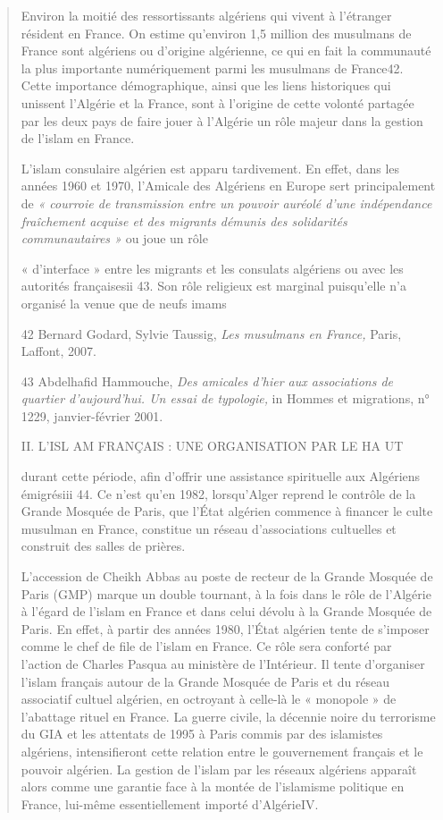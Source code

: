 \begin{quote}
Environ la moitié des ressortissants algériens qui vivent à l'étranger
résident en France. On estime qu'environ 1,5 million des musulmans de
France sont algériens ou d'origine algérienne, ce qui en fait la
communauté la plus importante numériquement parmi les musulmans de
France42. Cette importance démographique, ainsi que les liens
historiques qui unissent l'Algérie et la France, sont à l'origine de
cette volonté partagée par les deux pays de faire jouer à l'Algérie un
rôle majeur dans la gestion de l'islam en France.

L'islam consulaire algérien est apparu tardivement. En effet, dans les
années 1960 et 1970, l'Amicale des Algériens en Europe sert
principalement de \emph{« courroie de transmission entre un pouvoir
auréolé d'une indépendance fraîchement acquise et des migrants démunis
des solidarités communautaires »} ou joue un rôle

« d'interface » entre les migrants et les consulats algériens ou avec
les autorités françaisesii 43. Son rôle religieux est marginal
puisqu'elle n'a organisé la venue que de neufs imams

42 Bernard Godard, Sylvie Taussig, \emph{Les musulmans en France,}
Paris, Laffont, 2007.

43 Abdelhafid Hammouche, \emph{Des amicales d'hier aux associations de
quartier d'aujourd'hui. Un essai de typologie,} in Hommes et migrations,
n° 1229, janvier-février 2001.

II. L'ISL AM FRANÇAIS : UNE ORGANISATION PAR LE HA UT

durant cette période, afin d'offrir une assistance spirituelle aux
Algériens émigrésiii 44. Ce n'est qu'en 1982, lorsqu'Alger reprend le
contrôle de la Grande Mosquée de Paris, que l'État algérien commence à
financer le culte musulman en France, constitue un réseau d'associations
cultuelles et construit des salles de prières.

L'accession de Cheikh Abbas au poste de recteur de la Grande Mosquée de
Paris (GMP) marque un double tournant, à la fois dans le rôle de
l'Algérie à l'égard de l'islam en France et dans celui dévolu à la
Grande Mosquée de Paris. En effet, à partir des années 1980, l'État
algérien tente de s'imposer comme le chef de file de l'islam en France.
Ce rôle sera conforté par l'action de Charles Pasqua au ministère de
l'Intérieur. Il tente d'organiser l'islam français autour de la Grande
Mosquée de Paris et du réseau associatif cultuel algérien, en octroyant
à celle-là le « monopole » de l'abattage rituel en France. La guerre
civile, la décennie noire du terrorisme du GIA et les attentats de 1995
à Paris commis par des islamistes algériens, intensifieront cette
relation entre le gouvernement français et le pouvoir algérien. La
gestion de l'islam par les réseaux algériens apparaît alors comme une
garantie face à la montée de l'islamisme politique en France, lui-même
essentiellement importé d'AlgérieIV.


\end{quote}
